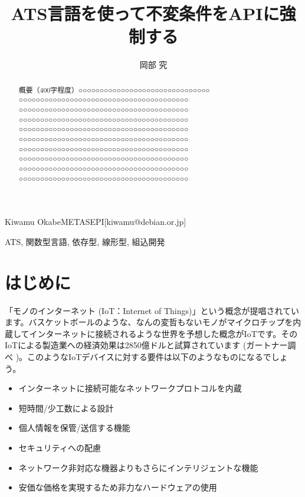 \documentclass{ipsjprosym}
\begin{document}
\title{ATS言語を使って不変条件をAPIに強制する}


\author{岡部 究}{Kiwamu Okabe}{METASEPI}[kiwamu@debian.or.jp]

\begin{abstract}
概要（400字程度）○○○○○○○○○○○○○○○○○○○○○○○○○○○○○○○
○○○○○○○○○○○○○○○○○○○○○○○○○○○○○○○○○○○○○○○○
○○○○○○○○○○○○○○○○○○○○○○○○○○○○○○○○○○○○○○○○
○○○○○○○○○○○○○○○○○○○○○○○○○○○○○○○○○○○○○○○○
○○○○○○○○○○○○○○○○○○○○○○○○○○○○○○○○○○○○○○○○
○○○○○○○○○○○○○○○○○○○○○○○○○○○○○○○○○○○○○○○○
○○○○○○○○○○○○○○○○○○○○○○○○○○○○○○○○○○○○○○○○
○○○○○○○○○○○○○○○○○○○○○○○○○○○○○○○○○○○○○○○○
○○○○○○○○○○○○○○○○○○○○○○○○○○○○○○○○○○○○○○○○
○○○○○○○○○○○○○○○○○○○○○○○○○○○○○○○○○○○○○○○○
\end{abstract}

\begin{jkeyword}
ATS, 関数型言語, 依存型, 線形型, 組込開発
\end{jkeyword}

\maketitle

\section{はじめに}

「モノのインターネット (IoT：Internet of Things)」という概念が提唱されています。バスケットボールのような、なんの変哲もないモノがマイクロチップを内蔵してインターネットに接続されるような世界を予想した概念がIoTです。そのIoTによる製造業への経済効果は2850億ドルと試算されています (ガートナー調べ \cite{iot_monoist})。このようなIoTデバイスに対する要件は以下のようなものになるでしょう。

\begin{itemize}
\item インターネットに接続可能なネットワークプロトコルを内蔵
\item 短時間/少工数による設計
\item 個人情報を保管/送信する機能
\item セキュリティへの配慮
\item ネットワーク非対応な機器よりもさらにインテリジェントな機能
\item 安価な価格を実現するため非力なハードウェアの使用
\end{itemize}
\end{document}
